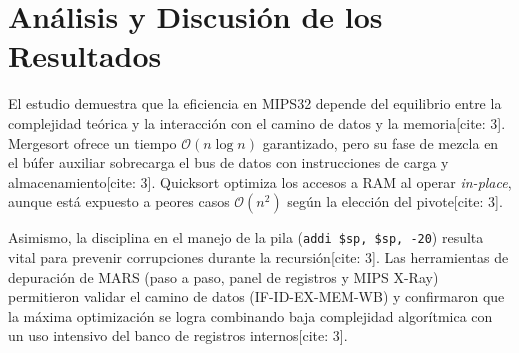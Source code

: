 \documentclass[12pt,a4paper]{article}
\begin{document}
\section{Análisis y Discusión de los Resultados}

El estudio demuestra que la eficiencia en MIPS32 depende del equilibrio entre la complejidad teórica y la interacción con el camino de datos y la memoria[cite: 3]. Mergesort ofrece un tiempo $\mathcal{O}(n \log n)$ garantizado, pero su fase de mezcla en el búfer auxiliar sobrecarga el bus de datos con instrucciones de carga y almacenamiento[cite: 3]. Quicksort optimiza los accesos a RAM al operar \textit{in-place}, aunque está expuesto a peores casos $\mathcal{O}(n^2)$ según la elección del pivote[cite: 3].

Asimismo, la disciplina en el manejo de la pila (\texttt{addi \$sp, \$sp, -20}) resulta vital para prevenir corrupciones durante la recursión[cite: 3]. Las herramientas de depuración de MARS (paso a paso, panel de registros y MIPS X-Ray) permitieron validar el camino de datos (IF-ID-EX-MEM-WB) y confirmaron que la máxima optimización se logra combinando baja complejidad algorítmica con un uso intensivo del banco de registros internos[cite: 3].
\end{document}
